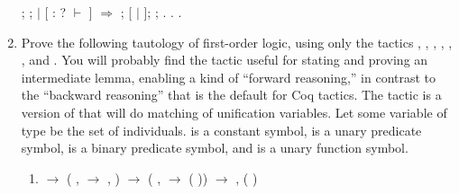 \documentclass[12pt]{report}
\begin{document}
\begin{enumerate}
\begin{coqdoccode}
\coqdocindent{2.00em}
    ;  ;\coqdoceol
\coqdocindent{3.00em}
  \coqdoceol
\coqdocindent{3.00em}
\ensuremath{|} [  : ?   \ensuremath{\vdash} \coqdocvar{\_} ] \ensuremath{\Rightarrow}  \coqdoceol
\coqdocindent{3.00em}
; [ \ensuremath{|} ]; ;  . .\coqdoceol
\coqdocnoindent
{} .\coqdoceol
\coqdocemptyline
\end{coqdoccode}
  \item Prove the following tautology of first-order logic, using only the tactics , , , , , , and .  You will probably find the  tactic useful for stating and proving an intermediate lemma, enabling a kind of ``forward reasoning,'' in contrast to the ``backward reasoning'' that is the default for Coq tactics.  The tactic  is a version of  that will do matching of unification variables.  Let some variable  of type  be the set of individuals.   is a constant symbol,  is a unary predicate symbol,  is a binary predicate symbol, and  is a unary function symbol.
\begin{enumerate}
    \item {}  \ensuremath{\rightarrow} (\coqdockw{\ensuremath{\forall}} ,   \ensuremath{\rightarrow} \coqdoctac{\ensuremath{\exists}} ,   ) \ensuremath{\rightarrow} (\coqdockw{\ensuremath{\forall}}  ,    \ensuremath{\rightarrow}   ( )) \ensuremath{\rightarrow} \coqdoctac{\ensuremath{\exists}} ,   ( )
  \end{enumerate}

\end{enumerate}
\end{document}
